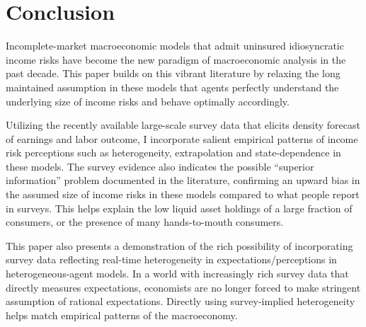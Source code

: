 \hypertarget{conclusion}{%
\section{Conclusion}\label{conclusion}}

Incomplete-market macroeconomic models that admit uninsured idiosyncratic income risks have become the new paradigm of macroeconomic analysis in the past decade. This paper builds on this vibrant literature by relaxing the long maintained assumption in these models that agents perfectly understand the underlying size of income risks and behave optimally accordingly. 

Utilizing the recently available large-scale survey data that elicits density forecast of earnings and labor outcome, I incorporate salient empirical patterns of income risk perceptions such as heterogeneity, extrapolation and state-dependence in these models. The survey evidence also indicates the possible ``superior information'' problem documented in the literature, confirming an upward bias in the assumed size of income risks in these models compared to what people report in surveys. This  helps explain the low liquid asset holdings of a large fraction of consumers, or the presence of many hands-to-mouth consumers. 

This paper also presents a demonstration of the rich possibility of incorporating survey data reflecting real-time heterogeneity in expectations/perceptions in heterogeneous-agent models. In a world with increasingly rich survey data that directly measures expectations, economists are no longer forced to make stringent  assumption of rational expectations. Directly using survey-implied heterogeneity helps match empirical patterns of the macroeconomy. 